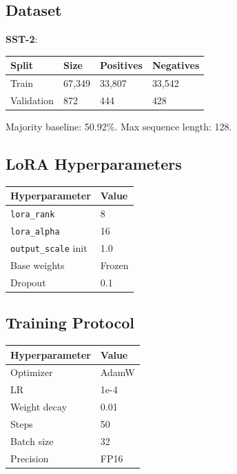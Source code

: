 \subsection{Dataset}

\textbf{SST-2}:

\begin{table}[H]
\centering
\small
\begin{tabular}{llll}
\toprule
\textbf{Split} & \textbf{Size} & \textbf{Positives} & \textbf{Negatives} \\
\midrule
Train & 67,349 & 33,807 & 33,542 \\
Validation & 872 & 444 & 428 \\
\bottomrule
\end{tabular}
\end{table}

Majority baseline: 50.92\%. Max sequence length: 128.

\subsection{LoRA Hyperparameters}

\begin{table}[H]
\centering
\small
\begin{tabular}{ll}
\toprule
\textbf{Hyperparameter} & \textbf{Value} \\
\midrule
\texttt{lora\_rank} & 8 \\
\texttt{lora\_alpha} & 16 \\
\texttt{output\_scale} init & 1.0 \\
Base weights & Frozen \\
Dropout & 0.1 \\
\bottomrule
\end{tabular}
\end{table}

\subsection{Training Protocol}

\begin{table}[H]
\centering
\small
\begin{tabular}{ll}
\toprule
\textbf{Hyperparameter} & \textbf{Value} \\
\midrule
Optimizer & AdamW \\
LR & 1e-4 \\
Weight decay & 0.01 \\
Steps & 50 \\
Batch size & 32 \\
Precision & FP16 \\
\bottomrule
\end{tabular}
\end{table}

